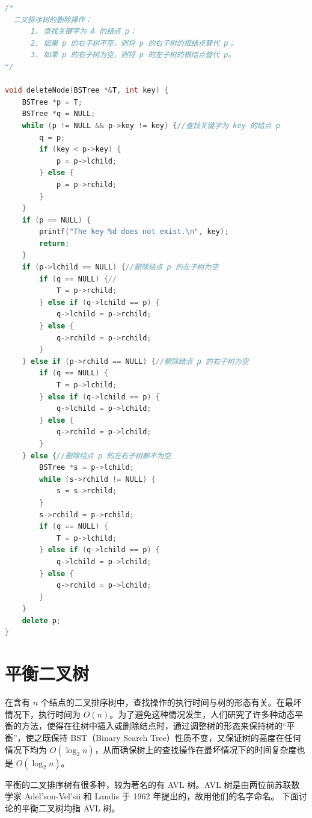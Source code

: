 \documentclass[lang=cn,newtx,10pt,scheme=chinese]{../elegantbook}
\begin{document}
\begin{lstlisting}[language=C++, caption={二叉排序树的删除操作}]
  /*
  二叉排序树的删除操作：
      1. 查找关键字为 A 的结点 p；
      2. 如果 p 的右子树不空，则将 p 的右子树的根结点替代 p；
      3. 如果 p 的右子树为空，则将 p 的左子树的根结点替代 p。
*/

void deleteNode(BSTree *&T, int key) {
    BSTree *p = T;
    BSTree *q = NULL;
    while (p != NULL && p->key != key) {//查找关键字为 key 的结点 p
        q = p;
        if (key < p->key) {
            p = p->lchild;
        } else {
            p = p->rchild;
        }
    }
    if (p == NULL) {
        printf("The key %d does not exist.\n", key);
        return;
    }
    if (p->lchild == NULL) {//删除结点 p 的左子树为空
        if (q == NULL) {//
            T = p->rchild;
        } else if (q->lchild == p) {
            q->lchild = p->rchild;
        } else {
            q->rchild = p->rchild;
        }
    } else if (p->rchild == NULL) {//删除结点 p 的右子树为空
        if (q == NULL) {
            T = p->lchild;
        } else if (q->lchild == p) {
            q->lchild = p->lchild;
        } else {
            q->rchild = p->lchild;
        }
    } else {//删除结点 p 的左右子树都不为空
        BSTree *s = p->lchild;
        while (s->rchild != NULL) {
            s = s->rchild;
        }
        s->rchild = p->rchild;
        if (q == NULL) {
            T = p->lchild;
        } else if (q->lchild == p) {
            q->lchild = p->lchild;
        } else {
            q->rchild = p->lchild;
        }
    }
    delete p;
}
\end{lstlisting}






\section{平衡二叉树}

在含有 $n$ 个结点的二叉排序树中，查找操作的执行时间与树的形态有关。在最坏情况下，执行时间为 $O(n)$。为了避免这种情况发生，人们研究了许多种动态平衡的方法，使得在往树中插入或删除结点时，通过调整树的形态来保持树的“平衡”，使之既保持 BST（Binary Search Tree）性质不变，又保证树的高度在任何情况下均为 $O(\log_2 n)$，从而确保树上的查找操作在最坏情况下的时间复杂度也是 $O(\log_2 n)$。

平衡的二叉排序树有很多种，较为著名的有 AVL 树。AVL 树是由两位前苏联数学家 Adel'son-Vel'sii 和 Landis 于 1962 年提出的，故用他们的名字命名。
下面讨论的平衡二叉树均指 AVL 树。
\end{document}
